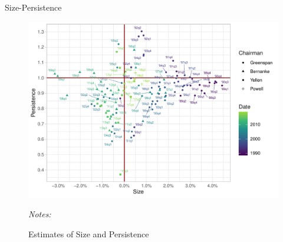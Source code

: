 \documentclass[10pt,aspectratio=169]{beamer}
\begin{document}

\begin{frame}{Size-Persistence}
    \begin{figure}[!hpbt]\centering
        \begin{minipage}{0.6\textwidth}
          \caption{Estimates of Size and Persistence} 
          \label{fig:size_persistence}
          \includegraphics[width=\linewidth]{actual_size_persistence_long.pdf}
        {\begin{flushleft}\tiny \textit{Notes:} \end{flushleft}} 
          \end{minipage}
      \end{figure}
    
\end{frame}
\end{document}
